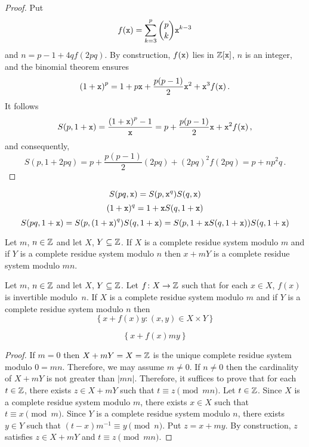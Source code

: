 \begin{proof}
   Put
   $$
   f(\mathtt{x}) = \sum_{k = 3}^p \binom{p}{k} \mathtt{x}^{k - 3} 
   $$
   and $n = p - 1 + 4 q f(2 p q)$.
   By construction, $f(\mathtt{x})$ lies in $\mathbb{Z}[\mathtt{x}]$,
   $n$ is an integer, and
   the binomial theorem ensures 
   $$
   {(1 + \mathtt{x})}^p = 1 + p \mathtt{x} + \frac{p(p - 1)}{2} \mathtt{x}^2 + \mathtt{x}^3 f(\mathtt{x})  \, .
   $$
   It follows
   $$
   S(p, 1 + \mathtt{x}) = \frac{{(1 + \mathtt{x})}^p - 1}{\mathtt{x}} = p + \frac{p(p - 1)}{2} \mathtt{x} + \mathtt{x}^2 f(\mathtt{x}) \,,
   $$
   and consequently,
   $$
   S(p, 1 + 2 pq) = p + \frac{p(p - 1)}{2} (2 p q) + {(2 p q )}^2 f(2 p q) = p + n p^2 q \,. 
   $$
 \end{proof}
 $$
 S(pq, \mathtt{x}) =  S(p, \mathtt{x}^q) S(q, \mathtt{x})   
 $$
 $$
 (1 +  \mathtt{x})^q   = 1 + \mathtt{x} S(q, 1 + \mathtt{x})
 $$
 $$
 S(pq, 1 + \mathtt{x})
 =  S(p, {(1 + \mathtt{x})}^q) S(q, 1 + \mathtt{x})
 =  S(p, 1 + \mathtt{x} S(q, 1 + \mathtt{x})) S(q, 1 + \mathtt{x})
 $$
 \begin{theorem}
 \end{theorem}
 
 \begin{theorem}
   Let $m$, $n \in \mathbb{Z}$ and let $X$, $Y \subseteq \mathbb{Z}$.
   If $X$ is a complete residue system modulo $m$ and
   if $Y$ is a complete residue system modulo $n$
   then
   $x + m Y$ is a complete residue system modulo $mn$.
 \end{theorem}
 \begin{theorem}
   Let $m$, $n \in \mathbb{Z}$ and let $X$, $Y \subseteq \mathbb{Z}$.
   Let $f \colon X \to \mathbb{Z}$ such that for each $x \in X$, $f(x)$ is invertible modulo~$n$.
   If $X$ is a complete residue system modulo $m$ and
   if $Y$ is a complete residue system modulo $n$
   then
   $$
   \left\{ x +  f(x) y : (x, y) \in X \times Y \right\} 
   $$
 \end{theorem}

 $$
  \left\{ x + f(x) m y  \right\} 
 $$

 \begin{proof}
   If $m = 0$ then $X + m Y = X = \mathbb{Z}$ is the unique complete residue system modulo $0 = mn$.
   Therefore, we may assume $m \ne 0$.
   If $n \ne 0$ then the cardinality of $X + m Y$ is not greater than $|mn|$.
   Therefore, it suffices to prove that for each $t \in \mathbb{Z}$,
   there exists $z \in X + m Y$ such that $t \equiv z \pmod{mn}$.
   Let $t \in \mathbb{Z}$.
   Since $X$ is a complete residue system modulo $m$,
   there exists $x \in X$ such that $t \equiv x \pmod{m}$.
   Since $Y$ is a complete residue system modulo $n$,
   there exists $y \in Y$ such that $(t - x) m^{-1}  \equiv y \pmod{n}$.
   Put $z = x + m y$.
   By construction, $z$ satisfies $z \in X + m Y$ and $t \equiv z \pmod{mn}$.
\end{proof} 
 

